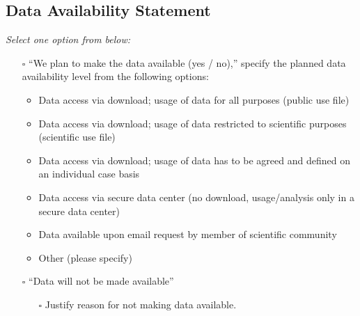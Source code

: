 \documentclass[
]{article}
\providecommand{\tightlist}{%
  \setlength{\itemsep}{0pt}\setlength{\parskip}{0pt}}\usepackage{longtable,booktabs,array}
\begin{document}
\subsection*{Data Availability
Statement}\label{data-availability-statement}

\begin{tcolorbox}[enhanced jigsaw, opacityback=0, left=2mm, opacitybacktitle=0.6, breakable, toptitle=1mm, rightrule=.15mm, titlerule=0mm, leftrule=.75mm, title=\textcolor{quarto-callout-caution-color}{\faFire}\hspace{0.5em}{Preregistration Item}, colback=white, arc=.35mm, bottomtitle=1mm, bottomrule=.15mm, colframe=quarto-callout-caution-color-frame, coltitle=black, colbacktitle=quarto-callout-caution-color!10!white, toprule=.15mm]

\emph{Select one option from below:}

\begin{itemize}
\tightlist
\item[$\square$]
  ``We plan to make the data available (yes / no),'' specify the planned
  data availability level from the following options:

  \begin{itemize}
  \tightlist
  \item
    Data access via download; usage of data for all purposes (public use
    file)
  \item
    Data access via download; usage of data restricted to scientific
    purposes (scientific use file)
  \item
    Data access via download; usage of data has to be agreed and defined
    on an individual case basis
  \item
    Data access via secure data center (no download, usage/analysis only
    in a secure data center)
  \item
    Data available upon email request by member of scientific community
  \item
    Other (please specify)
  \end{itemize}
\item[$\square$]
  ``Data will not be made available''

  \begin{itemize}
  \tightlist
  \item[$\square$]
    Justify reason for not making data available.
  \end{itemize}
\end{itemize}

\end{tcolorbox}
\end{document}
